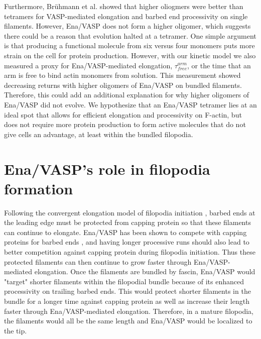 Furthermore, Br\"{u}hmann et al. showed that higher oliogmers were better than tetramers for VASP-mediated elongation and barbed end processivity on single filaments. However, Ena/VASP does not form a higher oligomer, which suggests there could be a reason that evolution halted at a tetramer. One simple argument is that producing a functional molecule from six versus four monomers puts more strain on the cell for protein production. However, with our kinetic model we also measured a proxy for Ena/VASP-mediated elongation, $\tau_{free}^{arm}$, or the time that an arm is free to bind actin monomers from solution. This measurement showed decreasing returns with higher oligomers of Ena/VASP on bundled filaments. Therefore, this could add an additional explanation for why higher oligomers of Ena/VASP did not evolve. We hypothesize that an Ena/VASP tetramer lies at an ideal spot that allows for efficient elongation and processivity on F-actin, but does not require more protein production to form active molecules that do not give cells an advantage, at least within the bundled filopodia. 

\section{Ena/VASP's role in filopodia formation}\label{ena-filopodia-conclusions}

Following the convergent elongation model of filopodia initiation \citep{svitkina_mechanism_2003}, barbed ends at the leading edge must be protected from capping protein so that these filaments can continue to elongate. Ena/VASP has been shown to compete with capping proteins for barbed ends \citep{applewhite_ena/vasp_2007,barzik_ena/vasp_2005, winkelman_ena/vasp_2014}, and having longer processive runs should also lead to better competition against capping protein during filopodia initiation. Thus these protected filaments can then continue to grow faster through Ena/VASP-mediated elongation. Once the filaments are bundled by fascin, Ena/VASP would "target" shorter filaments within the filopodial bundle because of its enhanced processivity on trailing barbed ends. This would protect shorter filaments in the bundle for a longer time against capping protein as well as increase their length faster through Ena/VASP-mediated elongation. Therefore, in a mature filopodia, the filaments would all be the same length and Ena/VASP would be localized to the tip.

